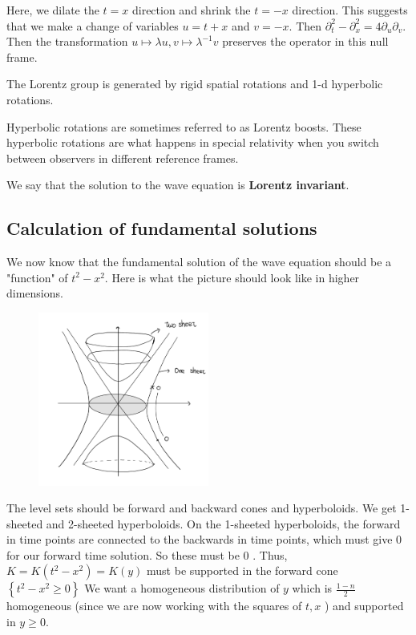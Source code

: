 \begin{itemize}
\begin{figure}[H]
\end{figure}
Here, we dilate the $t=x$ direction and shrink the $t=-x$ direction. This suggests that we make a change of variables $u=t+x$ and $v=-x .$ Then $\partial_{t}^{2}-\partial_{x}^{2}=4 \partial_{u} \partial_{v}$. Then the transformation $u \mapsto \lambda u, v \mapsto \lambda^{-1} v$ preserves the operator in this null frame.
\end{itemize}

\begin{theorem}
    The Lorentz group is generated by rigid spatial rotations and 1-d hyperbolic rotations.
\end{theorem}

\begin{remark}
    Hyperbolic rotations are sometimes referred to as Lorentz boosts. These hyperbolic rotations are what happens in special relativity when you switch between observers in different reference frames.
\end{remark}

We say that the solution to the wave equation is \textbf{Lorentz invariant}.

\subsection{Calculation of fundamental solutions}
We now know that the fundamental solution of the wave equation should be a "function" of $t^{2}-x^{2} .$ Here is what the picture should look like in higher dimensions.

\begin{figure}[H]
    \centering
    \includegraphics[width=0.5\textwidth]{pics/20-3.png}
\end{figure}

The level sets should be forward and backward cones and hyperboloids. We get 1-sheeted and 2-sheeted hyperboloids. On the 1-sheeted hyperboloids, the forward in time points are connected to the backwards in time points, which must give 0 for our forward time solution. So these must be 0 . Thus, $K=K\left(t^{2}-x^{2}\right)=K(y)$ must be supported in the forward cone $\left\{t^{2}-x^{2} \geq 0\right\}$ We want a homogeneous distribution of $y$ which is $\frac{1-n}{2}$ homogeneous (since we are now working with the squares of $t, x$ ) and supported in $y \geq 0$.

